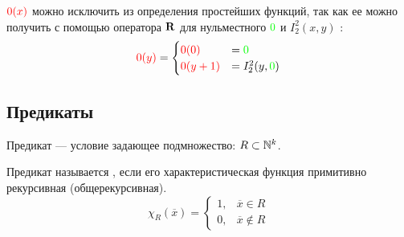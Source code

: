 \begin{note}
	$ {\color{red}0(x)}$ можно исключить из определения простейших функций, так как ее можно получить с помощью оператора $ \mathbf{R}$ для нульместного $ {\color{green}0}$ и $ I^{2}_{2} (x, y)$ :
	\[
		{\color{red}0(y)} = 
		\begin{cases}
			{\color{red}0(0)} &= {\color{green}0} \\
			{\color{red}0(y+1)} &=I^{2}_{2} (y, {\color{green}0})
		\end{cases}
	\] 
\end{note}


\subsection{Предикаты}
\begin{defn}
	Предикат --- условие задающее подмножество: $ R \subset \mathbb{N}^{k}$.
	
	\noindent
	Предикат называется , если его характеристическая функция примитивно рекурсивная (общерекурсивная).
\[
	\chi_{R}(\overline{x})= 
	\begin{cases}
		1, &\overline{x} \in  R \\
		0, &\overline{x} \notin R
	\end{cases}
\] 
\end{defn}


